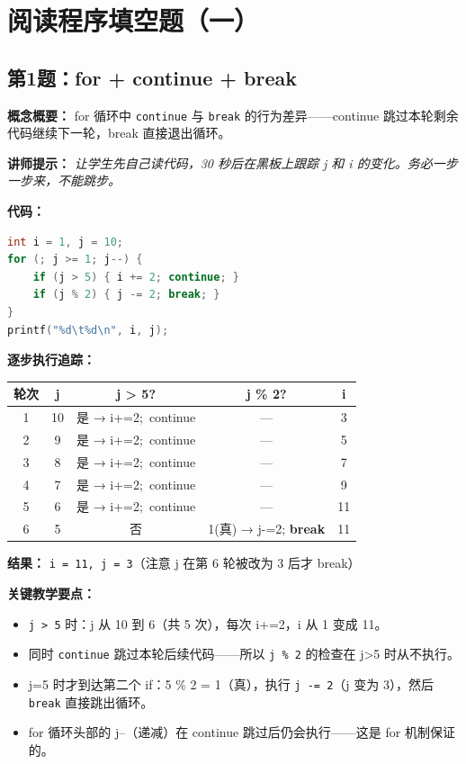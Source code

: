 \section{阅读程序填空题（一）}

\subsection{第1题：for + continue + break}

\textbf{概念概要：} for 循环中 \texttt{continue} 与 \texttt{break} 的行为差异——continue 跳过本轮剩余代码继续下一轮，break 直接退出循环。

\medskip
\textbf{讲师提示：} \textit{让学生先自己读代码，30 秒后在黑板上跟踪 j 和 i 的变化。务必一步一步来，不能跳步。}

\smallskip
\textbf{代码：}
\begin{lstlisting}[language=C]
int i = 1, j = 10;
for (; j >= 1; j--) {
    if (j > 5) { i += 2; continue; }
    if (j % 2) { j -= 2; break; }
}
printf("%d\t%d\n", i, j);
\end{lstlisting}

\smallskip
\textbf{逐步执行追踪：}

\begin{center}
\begin{tabular}{c|c|c|c|c}
\hline
\textbf{轮次} & \textbf{j} & \textbf{j > 5?} & \textbf{j \% 2?} & \textbf{i} \\
\hline
1  & 10 & 是 → i+=2;\ continue & — & 3 \\
2  & 9  & 是 → i+=2;\ continue & — & 5 \\
3  & 8  & 是 → i+=2;\ continue & — & 7 \\
4  & 7  & 是 → i+=2;\ continue & — & 9 \\
5  & 6  & 是 → i+=2;\ continue & — & 11 \\
6  & 5  & 否 & 1(真) → j-=2; \textbf{break} & 11 \\
\hline
\end{tabular}
\end{center}

\smallskip
\textbf{结果：} \texttt{i = 11, j = 3}（注意 j 在第 6 轮被改为 3 后才 break）

\textbf{关键教学要点：}
\begin{itemize}
    \item \texttt{j > 5} 时：j 从 10 到 6（共 5 次），每次 i+=2，i 从 1 变成 11。
    \item 同时 \texttt{continue} 跳过本轮后续代码——所以 \texttt{j \% 2} 的检查在 j>5 时从不执行。
    \item j=5 时才到达第二个 if：5 \% 2 = 1（真），执行 \texttt{j -= 2}（j 变为 3），然后 \texttt{break} 直接跳出循环。
    \item for 循环头部的 j--（递减）在 continue 跳过后仍会执行——这是 for 机制保证的。
\end{itemize}

